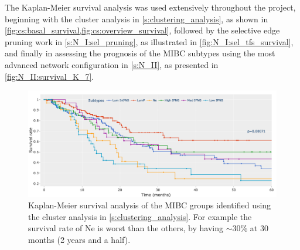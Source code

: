 The Kaplan-Meier survival analysis was used extensively throughout the project, beginning with the cluster analysis in \cref{s:clustering_analysis}, as shown in \cref{fig:cs:basal_survival,fig:cs:overview_survival}, followed by the selective edge pruning work in \cref{s:N_I:sel_pruning}, as illustrated in \cref{fig:N_I:sel_tfs_survival}, and finally in assessing the prognosis of the MIBC subtypes using the most advanced network configuration in \cref{s:N_II}, as presented in \cref{fig:N_II:survival_K_7}.


\begin{figure}[!htb]
    \centering
    \includegraphics[width=1.0\textwidth, keepaspectratio]{Sections/ClusteringAnalysis/Resources/discussion/survival_K_6.png}
    \caption[Example - Kaplan-Meier]{Kaplan-Meier survival analysis of the MIBC groups identified using the cluster analysis in \cref{s:clustering_analysis}. For example the survival rate of Ne is worst than the others, by having $\sim$30\% at 30 months (2 years and a half).}
    \label{fig:lit:surival_eg}
\end{figure}
